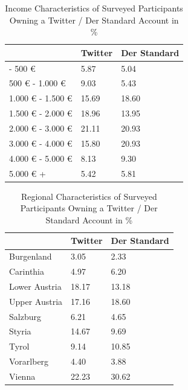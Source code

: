 \documentclass[
  english,
  jou,floatsintext]{apa7}
\begin{document}
\begin{table}[tbp]

\begin{center}
\begin{threeparttable}

\caption{\label{tab:Table-4}Income Characteristics of Surveyed Participants Owning a Twitter / Der Standard Account in \%}

\small{

\begin{tabular}{m{2.4cm}m{2.4cm}m{2.4cm}}
\toprule
 & \multicolumn{1}{c}{Twitter} & \multicolumn{1}{c}{Der Standard}\\
\midrule
- 500 € & 5.87 & 5.04\\
500 € - 1.000 € & 9.03 & 5.43\\
1.000 € - 1.500 € & 15.69 & 18.60\\
1.500 € - 2.000 € & 18.96 & 13.95\\
2.000 € - 3.000 € & 21.11 & 20.93\\
3.000 € - 4.000 € & 15.80 & 20.93\\
4.000 € - 5.000 € & 8.13 & 9.30\\
5.000 € + & 5.42 & 5.81\\
\bottomrule
\end{tabular}

}

\end{threeparttable}
\end{center}

\end{table}

\begin{table}[tbp]

\begin{center}
\begin{threeparttable}

\caption{\label{tab:Table-5}Regional Characteristics of Surveyed Participants Owning a Twitter / Der Standard Account in \%}

\small{

\begin{tabular}{m{2.4cm}m{2.4cm}m{2.4cm}}
\toprule
 & \multicolumn{1}{c}{Twitter} & \multicolumn{1}{c}{Der Standard}\\
\midrule
Burgenland & 3.05 & 2.33\\
Carinthia & 4.97 & 6.20\\
Lower Austria & 18.17 & 13.18\\
Upper Austria & 17.16 & 18.60\\
Salzburg & 6.21 & 4.65\\
Styria & 14.67 & 9.69\\
Tyrol & 9.14 & 10.85\\
Vorarlberg & 4.40 & 3.88\\
Vienna & 22.23 & 30.62\\
\bottomrule
\end{tabular}

}

\end{threeparttable}
\end{center}

\end{table}
\end{document}
